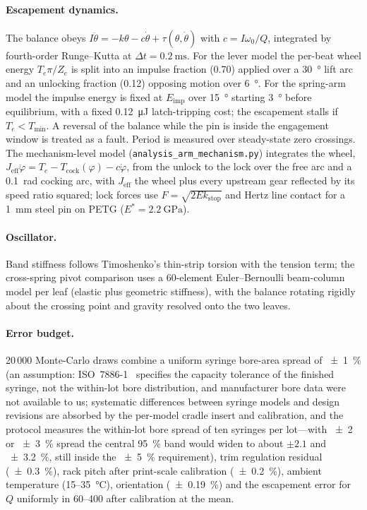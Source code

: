 \documentclass[11pt,a4paper]{article}
\begin{document}
\paragraph{Escapement dynamics.} The balance obeys $I\ddot\theta = -k\theta - c\dot\theta + \tau(\theta,\dot\theta)$ with $c = I\omega_0/Q$, integrated by fourth-order Runge--Kutta at $\Delta t = \SI{0.2}{\milli\second}$. For the lever model the per-beat wheel energy $T_e\pi/Z_e$ is split into an impulse fraction (0.70) applied over a \SI{30}{\degree} lift arc and an unlocking fraction (0.12) opposing motion over \SI{6}{\degree}. For the spring-arm model the impulse energy is fixed at $E_{\mathrm{imp}}$ over \SI{15}{\degree} starting \SI{3}{\degree} before equilibrium, with a fixed \SI{0.12}{\micro\joule} latch-tripping cost; the escapement stalls if $T_e < T_{\min}$. A reversal of the balance while the pin is inside the engagement window is treated as a fault. Period is measured over steady-state zero crossings. The mechanism-level model (\texttt{analysis\_arm\_mechanism.py}) integrates the wheel, $J_{\mathrm{eff}}\ddot\varphi = T_e - T_{\mathrm{cock}}(\varphi) - c\dot\varphi$, from the unlock to the lock over the free arc and a \SI{0.1}{\radian} cocking arc, with $J_{\mathrm{eff}}$ the wheel plus every upstream gear reflected by its speed ratio squared; lock forces use $F = \sqrt{2 E k_{\mathrm{stop}}}$ and Hertz line contact for a \SI{1}{\milli\metre} steel pin on PETG ($E^* = \SI{2.2}{\giga\pascal}$).

\paragraph{Oscillator.} Band stiffness follows Timoshenko's thin-strip torsion with the tension term; the cross-spring pivot comparison uses a 60-element Euler--Bernoulli beam-column model per leaf (elastic plus geometric stiffness), with the balance rotating rigidly about the crossing point and gravity resolved onto the two leaves.

\paragraph{Error budget.} 20\,000 Monte-Carlo draws combine a uniform syringe bore-area spread of \SI{\pm 1}{\percent} (an assumption: ISO~7886-1~\cite{iso7886} specifies the capacity tolerance of the finished syringe, not the within-lot bore distribution, and manufacturer bore data were not available to us; systematic differences between syringe models and design revisions are absorbed by the per-model cradle insert and calibration, and the protocol measures the within-lot bore spread of ten syringes per lot---with \SI{\pm 2}{} or \SI{\pm 3}{\percent} spread the central \SI{95}{\percent} band would widen to about $\pm 2.1$ and \SI{\pm 3.2}{\percent}, still inside the \SI{\pm 5}{\percent} requirement), trim regulation residual (\SI{\pm 0.3}{\percent}), rack pitch after print-scale calibration (\SI{\pm 0.2}{\percent}), ambient temperature (15--\SI{35}{\celsius}), orientation (\SI{\pm 0.19}{\percent}) and the escapement error for $Q$ uniformly in 60--400 after calibration at the mean.
\end{document}
